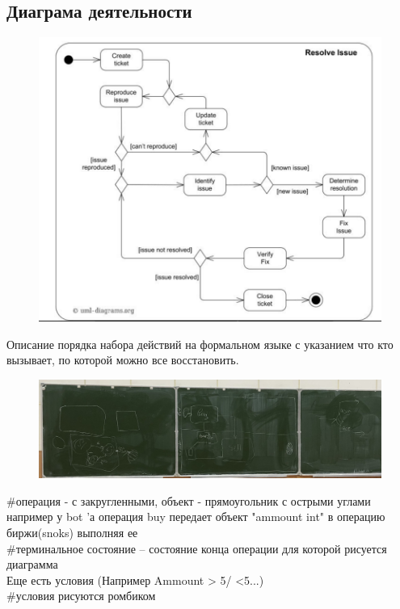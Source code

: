\documentclass[12pt; a4paper]{book}
\theoremstyle{plain} %
\theoremstyle{defenition}
\theoremstyle{remark}
\begin{document}
\newpage
\subsection{Диаграма деятельности}
\begin{figure}[!htbp]
\includegraphics[angle=0, width=\textwidth]{IMG/5} \\
\end{figure}

Описание порядка набора действий на формальном языке с указанием что кто вызывает, по которой можно все восстановить. \\
\begin{figure}[!htbp]
\includegraphics[angle=0, width=\textwidth]{IMG/IMG_0823.jpg} \\
\end{figure}

\#операция - с закругленными, объект - прямоугольник с острыми углами \\
например у bot 'а операция buy передает объект "ammount int" в операцию биржи(snoks) выполняя ее\\
\#терминальное состояние -- состояние конца операции для которой рисуется диаграмма \\
Еще есть условия (Например Ammount > 5/ <5...) \\
\#условия рисуются ромбиком\\\
\end{document}

